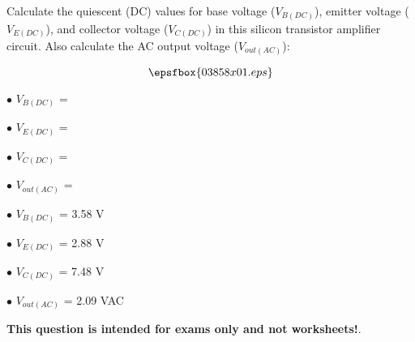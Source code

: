 

Calculate the quiescent (DC) values for base voltage ($V_{B(DC)}$), emitter voltage ($V_{E(DC)}$), and collector voltage ($V_{C(DC)}$) in this silicon transistor amplifier circuit.  Also calculate the AC output voltage ($V_{out(AC)}$):

$$\epsfbox{03858x01.eps}$$

\medskip
\item{$\bullet$} $V_{B(DC)}$ = 
\item{$\bullet$} $V_{E(DC)}$ = 
\item{$\bullet$} $V_{C(DC)}$ = 
\item{$\bullet$} $V_{out(AC)}$ = 
\medskip







\medskip
\goodbreak
\item{$\bullet$} $V_{B(DC)}$ = 3.58 V
\item{$\bullet$} $V_{E(DC)}$ = 2.88 V
\item{$\bullet$} $V_{C(DC)}$ = 7.48 V
\item{$\bullet$} $V_{out(AC)}$ = 2.09 VAC
\medskip







{\bf This question is intended for exams only and not worksheets!}.



